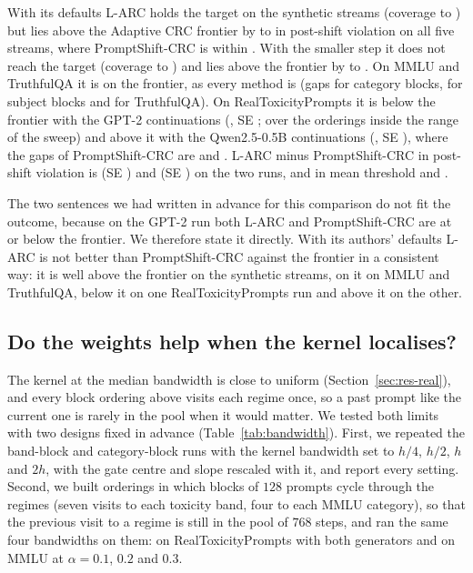 With its defaults L-ARC holds the target on the synthetic streams (coverage \LarcSynCovLo{} to \LarcSynCovHi{}) but lies above the Adaptive CRC frontier by \LarcSynLo{} to \LarcSynHi{} in post-shift violation on all five streams, where PromptShift-CRC is within \PSfrontierMaxAbs{}. With the smaller step it does not reach the target (coverage \LarcSynSmallCovLo{} to \LarcSynSmallCovHi{}) and lies above the frontier by \LarcSynSmallLo{} to \LarcSynSmallHi{}. On MMLU and TruthfulQA it is on the frontier, as every method is (gaps \LarcMmluCatGap{} for category blocks, \LarcMmluSubjGap{} for subject blocks and \LarcTqaGap{} for TruthfulQA). On RealToxicityPrompts it is below the frontier with the GPT-2 continuations (\LarcRtpGap{}, SE \LarcRtpGapSE{}; \LarcRtpGapIn{} over the \LarcRtpGapInN{} orderings inside the range of the sweep) and above it with the Qwen2.5-0.5B continuations (\LarcRtpQGap{}, SE \LarcRtpQGapSE{}), where the gaps of PromptShift-CRC are \RtpFrontierPS{} and \RtpQFrontierPS{}. L-ARC minus PromptShift-CRC in post-shift violation is \LarcRtpMinusPS{} (SE \LarcRtpMinusPSSE{}) and \LarcRtpQMinusPS{} (SE \LarcRtpQMinusPSSE{}) on the two runs, and in mean threshold \LarcRtpThr{} and \LarcRtpQThr{}.

The two sentences we had written in advance for this comparison do not fit the outcome, because on the GPT-2 run both L-ARC and PromptShift-CRC are at or below the frontier. We therefore state it directly. With its authors' defaults L-ARC is not better than PromptShift-CRC against the frontier in a consistent way: it is well above the frontier on the synthetic streams, on it on MMLU and TruthfulQA, below it on one RealToxicityPrompts run and above it on the other.

\subsection{Do the weights help when the kernel localises?}\label{sec:res-bw}

The kernel at the median bandwidth is close to uniform (Section~\ref{sec:res-real}), and every block ordering above visits each regime once, so a past prompt like the current one is rarely in the pool when it would matter. We tested both limits with two designs fixed in advance (Table~\ref{tab:bandwidth}). First, we repeated the band-block and category-block runs with the kernel bandwidth set to $h/4$, $h/2$, $h$ and $2h$, with the gate centre and slope rescaled with it, and report every setting. Second, we built orderings in which blocks of $128$ prompts cycle through the regimes (seven visits to each toxicity band, four to each MMLU category), so that the previous visit to a regime is still in the pool of $768$ steps, and ran the same four bandwidths on them: on RealToxicityPrompts with both generators and on MMLU at $\alpha=0.1$, $0.2$ and $0.3$.

